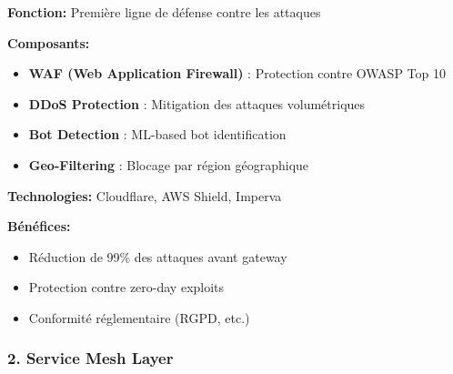 \documentclass[12pt,a4paper]{article}
\begin{document}
\begin{tcolorbox}[colback=green!5,colframe=green!50!black,title=\textbf{Nouveau Composant: Security \& Edge Layer}]

\textbf{Fonction:} Première ligne de défense contre les attaques

\textbf{Composants:}
\begin{itemize}[noitemsep]
    \item \textbf{WAF (Web Application Firewall)} : Protection contre OWASP Top 10
    \item \textbf{DDoS Protection} : Mitigation des attaques volumétriques
    \item \textbf{Bot Detection} : ML-based bot identification
    \item \textbf{Geo-Filtering} : Blocage par région géographique
\end{itemize}

\textbf{Technologies:} Cloudflare, AWS Shield, Imperva

\textbf{Bénéfices:}
\begin{itemize}[noitemsep]
    \item Réduction de 99\% des attaques avant gateway
    \item Protection contre zero-day exploits
    \item Conformité réglementaire (RGPD, etc.)
\end{itemize}
\end{tcolorbox}

\subsubsection{2. Service Mesh Layer}
\end{document}
